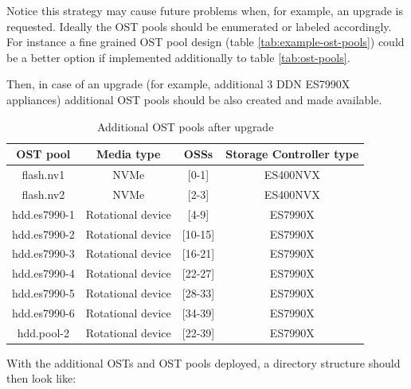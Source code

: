 \documentclass{article}
\begin{document}

Notice this strategy may cause future problems when, for example, an upgrade is requested. Ideally the OST pools should be enumerated or labeled accordingly. For instance a fine grained OST pool design (table \ref{tab:example-ost-pools}) could be a better option if implemented additionally to table \ref{tab:ost-pools}.


Then, in case of an upgrade (for example, additional 3 DDN ES7990X appliances) additional OST pools should be also created and made available.
\begin{table}[h]
\centering
 \begin{tabular}{||c c c c||} 
 \hline
 OST pool & Media type & OSSs & Storage Controller type \\ [0.5ex] 
 \hline\hline
 flash.nv1 & NVMe & [0-1] & ES400NVX \\ 
 \hline
  flash.nv2 & NVMe & [2-3] & ES400NVX \\ 
 \hline
 hdd.es7990-1 & Rotational device & [4-9] & ES7990X\\
 \hline
  hdd.es7990-2 & Rotational device & [10-15] & ES7990X\\
 \hline
  hdd.es7990-3 & Rotational device & [16-21] & ES7990X\\
 \hline
  hdd.es7990-4 & Rotational device & [22-27] & ES7990X\\
 \hline
 hdd.es7990-5 & Rotational device & [28-33] & ES7990X\\
 \hline
 hdd.es7990-6 & Rotational device & [34-39] & ES7990X\\
 \hline
 hdd.pool-2 & Rotational device & [22-39] & ES7990X\\
 \hline
 \end{tabular}
 \caption{Additional OST pools after upgrade}
 \label{tab:example-ost-pools-upgrade}
\end{table}


With the additional OSTs and OST pools deployed, a directory structure should then look like:

\end{document}

